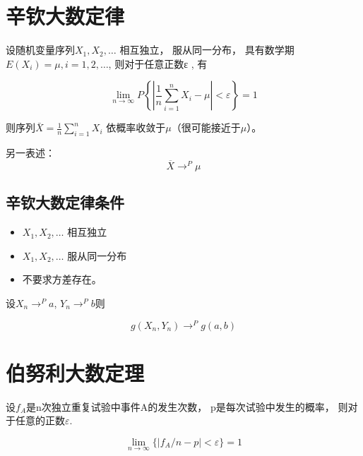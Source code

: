 \section{辛钦大数定律}

\begin{theorem}[辛钦大数定律]
    设随机变量序列$X_1,X_2, …$   相互独立， 服从同一分布， 具有数学期$E(X_i)=\mu, i=1,2,…$,  则对于任意正数ε , 有

\begin{equation}\lim _{n \rightarrow \infty} P\left\{\left|\frac{1}{n} \sum_{i=1}^{n} X_{i}-\mu\right|<\varepsilon\right\}=1\end{equation}

则序列$\bar{X}=\frac{1}{n} \sum_{i=1}^{n} X_{i}$ 依概率收敛于$\mu$（很可能接近于$\mu$）。
\end{theorem}

另一表述：
\begin{equation}\overline{X} \rightarrow^{P} \mu\end{equation}

\subsection{辛钦大数定律条件}

\begin{itemize}
    \item $X_1,X_2, …$ 相互独立
    \item $X_1,X_2, …$ 服从同一分布
    \item 不要求方差存在。 
\end{itemize}

\begin{corollary}
设${X_n \rightarrow^{P} a}$, ${Y_n \rightarrow^{P} b}$则

\begin{equation}
   g(X_n, Y_n) \rightarrow^{P} g(a,b)
\end{equation}
\end{corollary}

\section{伯努利大数定理}

\begin{theorem}[伯努利大数定理]
设$f_A$是n次独立重复试验中事件A的发生次数， p是每次试验中发生的概率， 则对于任意的正数$\varepsilon$.

\begin{equation}
 \lim_{n \to \infty}\{ |f_A/n - p| < \varepsilon\} = 1  
\end{equation}
\end{theorem}

